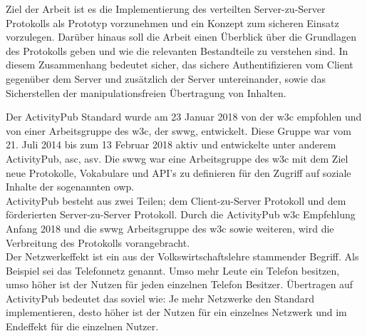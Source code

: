 {	%
	Ziel der Arbeit ist es die Implementierung des verteilten Server-zu-Server Protokolls als Prototyp vorzunehmen und ein Konzept zum sicheren Einsatz vorzulegen. Darüber hinaus soll die Arbeit einen Überblick über die Grundlagen des Protokolls geben und wie die relevanten Bestandteile zu verstehen sind. In diesem Zusammenhang bedeutet \glqq sicher\grqq, das sichere Authentifizieren vom Client gegenüber dem Server und zusätzlich der Server untereinander, sowie das Sicherstellen der manipulationsfreien Übertragung von Inhalten.\\
		
	
	Der ActivityPub\cite{activityPub} Standard wurde am 23 Januar 2018 von der \gls{w3c} empfohlen und von einer Arbeitsgruppe des \gls{w3c}, der \gls{swwg}\cite{socialWg,pushSocialWeb}, entwickelt. Diese Gruppe war vom 21. Juli 2014 bis zum 13 Februar 2018 aktiv\cite{socialWg} und entwickelte unter anderem ActivityPub, \gls{asc}\cite{activityStreamsCore}, \gls{asv}\cite{activityStreamsVocabulary}. Die \gls{swwg} war eine Arbeitsgruppe des \gls{w3c} mit dem Ziel neue Protokolle, Vokabulare und API's zu definieren für den Zugriff auf soziale Inhalte der sogenannten \gls{owp}\cite{social-wg-charter}.\\
	
	ActivityPub besteht aus zwei Teilen; dem Client-zu-Server Protokoll und dem förderierten Server-zu-Server Protokoll. Durch die ActivityPub \gls{w3c} Empfehlung Anfang 2018 und die \gls{swwg} Arbeitsgruppe des \gls{w3c} sowie weiteren, wird die Verbreitung des Protokolls vorangebracht.\\
	
	Der Netzwerkeffekt ist ein aus der Volkswirtschaftslehre stammender Begriff. Als Beispiel sei das Telefonnetz genannt. Umso mehr Leute ein Telefon besitzen, umso höher ist der Nutzen für jeden einzelnen Telefon Besitzer. Übertragen auf ActivityPub bedeutet das soviel wie: \glqq Je mehr Netzwerke den Standard implementieren, desto höher ist der Nutzen für ein einzelnes Netzwerk und im Endeffekt für die einzelnen Nutzer\grqq.\\
}

